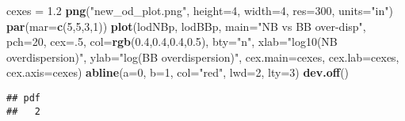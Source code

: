 \documentclass[]{article}
\newenvironment{Shaded}{\begin{snugshade}}{\end{snugshade}}
\newcommand{\KeywordTok}[1]{\textcolor[rgb]{0.13,0.29,0.53}{\textbf{#1}}}
\newcommand{\DataTypeTok}[1]{\textcolor[rgb]{0.13,0.29,0.53}{#1}}
\newcommand{\DecValTok}[1]{\textcolor[rgb]{0.00,0.00,0.81}{#1}}
\newcommand{\FloatTok}[1]{\textcolor[rgb]{0.00,0.00,0.81}{#1}}
\newcommand{\StringTok}[1]{\textcolor[rgb]{0.31,0.60,0.02}{#1}}
\newcommand{\NormalTok}[1]{#1}
\begin{document}
\begin{Shaded}
\begin{Highlighting}[]
\NormalTok{cexes =}\StringTok{ }\FloatTok{1.2}
\KeywordTok{png}\NormalTok{(}\StringTok{"new_od_plot.png"}\NormalTok{, }\DataTypeTok{height=}\DecValTok{4}\NormalTok{, }\DataTypeTok{width=}\DecValTok{4}\NormalTok{, }\DataTypeTok{res=}\DecValTok{300}\NormalTok{, }\DataTypeTok{units=}\StringTok{"in"}\NormalTok{)}
\KeywordTok{par}\NormalTok{(}\DataTypeTok{mar=}\KeywordTok{c}\NormalTok{(}\DecValTok{5}\NormalTok{,}\DecValTok{5}\NormalTok{,}\DecValTok{3}\NormalTok{,}\DecValTok{1}\NormalTok{))}
\KeywordTok{plot}\NormalTok{(lodNBp, lodBBp, }\DataTypeTok{main=}\StringTok{"NB vs BB over-disp"}\NormalTok{, }\DataTypeTok{pch=}\DecValTok{20}\NormalTok{, }\DataTypeTok{cex=}\NormalTok{.}\DecValTok{5}\NormalTok{, }\DataTypeTok{col=}\KeywordTok{rgb}\NormalTok{(}\FloatTok{0.4}\NormalTok{,}\FloatTok{0.4}\NormalTok{,}\FloatTok{0.4}\NormalTok{,}\FloatTok{0.5}\NormalTok{), }\DataTypeTok{bty=}\StringTok{"n"}\NormalTok{,}
     \DataTypeTok{xlab=}\StringTok{"log10(NB overdispersion)"}\NormalTok{, }\DataTypeTok{ylab=}\StringTok{"log(BB overdispersion)"}\NormalTok{, }\DataTypeTok{cex.main=}\NormalTok{cexes, }\DataTypeTok{cex.lab=}\NormalTok{cexes, }\DataTypeTok{cex.axis=}\NormalTok{cexes)}
\KeywordTok{abline}\NormalTok{(}\DataTypeTok{a=}\DecValTok{0}\NormalTok{, }\DataTypeTok{b=}\DecValTok{1}\NormalTok{, }\DataTypeTok{col=}\StringTok{"red"}\NormalTok{, }\DataTypeTok{lwd=}\DecValTok{2}\NormalTok{, }\DataTypeTok{lty=}\DecValTok{3}\NormalTok{)}
\KeywordTok{dev.off}\NormalTok{()}
\end{Highlighting}
\end{Shaded}

\begin{verbatim}
## pdf 
##   2
\end{verbatim}
\end{document}
